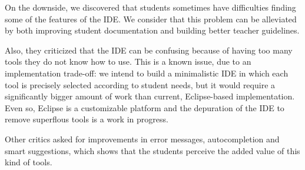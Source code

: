 %
%
%
\medskip
On the downside, 
we discovered that students sometimes have difficulties finding some of the features of the IDE.
We consider that this problem can be alleviated by both improving student documentation and building better teacher guidelines.

Also, they criticized that the IDE can be confusing because of having too many tools they do not know how to use.
This is a known issue, due to an implementation trade-off: 
we intend to build a minimalistic IDE in which each tool is precisely selected according to student needs,
but it would require a significantly bigger amount of work than current, Eclipse-based implementation.
Even so, Eclipse is a customizable platform and the depuration of the IDE to remove superflous tools is a work in progress.


Other critics asked for improvements in error messages, autocompletion and smart suggestions, 
which shows that the students perceive the added value of this kind of tools.

